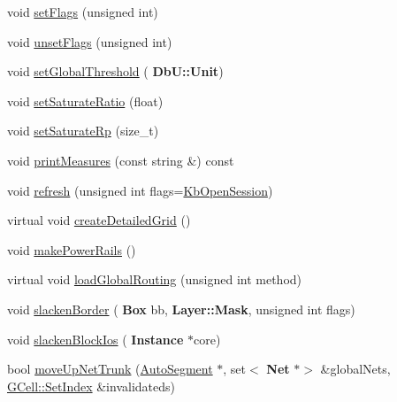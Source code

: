 \begin{DoxyCompactItemize}
\item 
void \mbox{\hyperlink{classKatabatic_1_1KatabaticEngine_aeb14f94914af58657a0dc2f50ec98df5}{set\+Flags}} (unsigned int)
\item 
void \mbox{\hyperlink{classKatabatic_1_1KatabaticEngine_a1a6fac115cb81db48e3ac9ffa0721bb5}{unset\+Flags}} (unsigned int)
\item 
void \mbox{\hyperlink{classKatabatic_1_1KatabaticEngine_a1bd1e0104b73d4c558b0e121002796a6}{set\+Global\+Threshold}} (\textbf{ Db\+U\+::\+Unit})
\item 
void \mbox{\hyperlink{classKatabatic_1_1KatabaticEngine_ac2b780e06975ce8a0d6ca96f20cb971f}{set\+Saturate\+Ratio}} (float)
\item 
void \mbox{\hyperlink{classKatabatic_1_1KatabaticEngine_ade227e828b8c8fbfce478e353ca3ca59}{set\+Saturate\+Rp}} (size\+\_\+t)
\item 
void \mbox{\hyperlink{classKatabatic_1_1KatabaticEngine_a2ea4b4fc379fb85a13890db451cbf93a}{print\+Measures}} (const string \&) const
\item 
void \mbox{\hyperlink{classKatabatic_1_1KatabaticEngine_a1e9bb62be35c6a415a1950c72c1964ef}{refresh}} (unsigned int flags=\mbox{\hyperlink{namespaceKatabatic_a2af2ad6b6441614038caf59d04b3b217af314588109fcc5f5ee1c42e5fd4d0ed5}{Kb\+Open\+Session}})
\item 
virtual void \mbox{\hyperlink{classKatabatic_1_1KatabaticEngine_a1b7d8ed09a198f7afd6e3ac911f6eb37}{create\+Detailed\+Grid}} ()
\item 
void \mbox{\hyperlink{classKatabatic_1_1KatabaticEngine_aaba3b9450c85634131146fb507089f2d}{make\+Power\+Rails}} ()
\item 
virtual void \mbox{\hyperlink{classKatabatic_1_1KatabaticEngine_a583925cfe4bbadcc1c24fe619debce09}{load\+Global\+Routing}} (unsigned int method)
\item 
void \mbox{\hyperlink{classKatabatic_1_1KatabaticEngine_a145b36b18fc9149980c5d6bd4bd10e0d}{slacken\+Border}} (\textbf{ Box} bb, \textbf{ Layer\+::\+Mask}, unsigned int flags)
\item 
void \mbox{\hyperlink{classKatabatic_1_1KatabaticEngine_ac40754d4a9bd0cf327b5fa088e993897}{slacken\+Block\+Ios}} (\textbf{ Instance} $\ast$core)
\item 
bool \mbox{\hyperlink{classKatabatic_1_1KatabaticEngine_ac934a049003c9d5d2380f44ff393e458}{move\+Up\+Net\+Trunk}} (\mbox{\hyperlink{classKatabatic_1_1AutoSegment}{Auto\+Segment}} $\ast$, set$<$ \textbf{ Net} $\ast$$>$ \&global\+Nets, \mbox{\hyperlink{classKatabatic_1_1GCell_aacb1c215b203bfba5729f135b3221d40}{G\+Cell\+::\+Set\+Index}} \&invalidateds)
$$
\end{DoxyCompactItemize}

